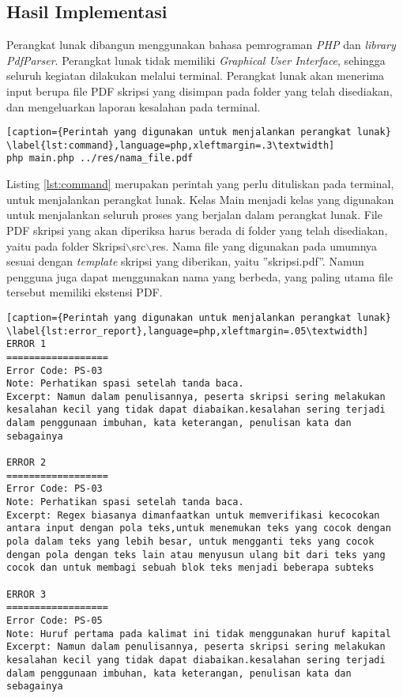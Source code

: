 \subsection{Hasil Implementasi}
Perangkat lunak dibangun menggunakan bahasa pemrograman \textit{PHP} dan \textit{library PdfParser}. Perangkat lunak tidak memiliki \textit{Graphical User Interface}, sehingga seluruh kegiatan dilakukan melalui terminal. Perangkat lunak akan menerima input berupa file PDF skripsi yang disimpan pada folder yang telah disediakan, dan mengeluarkan laporan kesalahan pada terminal.

\begin{lstlisting}[caption={Perintah yang digunakan untuk menjalankan perangkat lunak}	\label{lst:command},language=php,xleftmargin=.3\textwidth] 
php main.php ../res/nama_file.pdf
\end{lstlisting}
\medskip

Listing \ref{lst:command} merupakan perintah yang perlu dituliskan pada terminal, untuk menjalankan perangkat lunak. Kelas Main menjadi kelas yang digunakan untuk menjalankan seluruh proses yang berjalan dalam perangkat lunak. File PDF skripsi yang akan diperiksa harus berada di folder yang telah disediakan, yaitu pada folder Skripsi$\backslash$src$\backslash$res. Nama file yang digunakan pada umumnya sesuai dengan \textit{template} skripsi yang diberikan, yaitu ''skripsi.pdf''. Namun pengguna juga dapat menggunakan nama yang berbeda, yang paling utama file tersebut memiliki ekstensi PDF.

\begin{lstlisting}[caption={Perintah yang digunakan untuk menjalankan perangkat lunak}	\label{lst:error_report},language=php,xleftmargin=.05\textwidth] 
ERROR 1
==================
Error Code: PS-03
Note: Perhatikan spasi setelah tanda baca.
Excerpt: Namun dalam penulisannya, peserta skripsi sering melakukan kesalahan kecil yang tidak dapat diabaikan.kesalahan sering terjadi dalam penggunaan imbuhan, kata keterangan, penulisan kata dan sebagainya

ERROR 2
==================
Error Code: PS-03
Note: Perhatikan spasi setelah tanda baca.
Excerpt: Regex biasanya dimanfaatkan untuk memverifikasi kecocokan antara input dengan pola teks,untuk menemukan teks yang cocok dengan pola dalam teks yang lebih besar, untuk mengganti teks yang cocok dengan pola dengan teks lain atau menyusun ulang bit dari teks yang cocok dan untuk membagi sebuah blok teks menjadi beberapa subteks

ERROR 3
==================
Error Code: PS-05
Note: Huruf pertama pada kalimat ini tidak menggunakan huruf kapital
Excerpt: Namun dalam penulisannya, peserta skripsi sering melakukan kesalahan kecil yang tidak dapat diabaikan.kesalahan sering terjadi dalam penggunaan imbuhan, kata keterangan, penulisan kata dan sebagainya
\end{lstlisting}
\medskip

